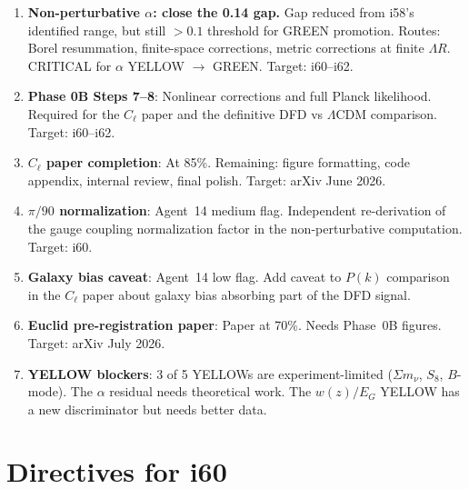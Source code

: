 \documentclass[11pt,a4paper]{article}
\begin{document}
\begin{enumerate}[label=\textbf{P\arabic*.}]
\item \textbf{Non-perturbative $\alpha$: close the 0.14 gap.} Gap reduced from i58's identified range, but still $> 0.1$ threshold for GREEN promotion. Routes: Borel resummation, finite-space corrections, metric corrections at finite $\Lambda R$. CRITICAL for $\alpha$ YELLOW $\to$ GREEN. Target: i60--i62.

\item \textbf{Phase 0B Steps 7--8}: Nonlinear corrections and full Planck likelihood. Required for the $C_\ell$ paper and the definitive DFD vs $\Lambda$CDM comparison. Target: i60--i62.

\item \textbf{$C_\ell$ paper completion}: At 85\%. Remaining: figure formatting, code appendix, internal review, final polish. Target: arXiv June 2026.

\item \textbf{$\pi/90$ normalization}: Agent~14 medium flag. Independent re-derivation of the gauge coupling normalization factor in the non-perturbative computation. Target: i60.

\item \textbf{Galaxy bias caveat}: Agent~14 low flag. Add caveat to $P(k)$ comparison in the $C_\ell$ paper about galaxy bias absorbing part of the DFD signal.

\item \textbf{Euclid pre-registration paper}: Paper at 70\%. Needs Phase~0B figures. Target: arXiv July 2026.

\item \textbf{YELLOW blockers}: 3 of 5 YELLOWs are experiment-limited ($\Sigma m_\nu$, $S_8$, $B$-mode). The $\alpha$ residual needs theoretical work. The $w(z)/E_G$ YELLOW has a new discriminator but needs better data.
\end{enumerate}


\section{Directives for i60}
\label{sec:directives}
\end{document}
